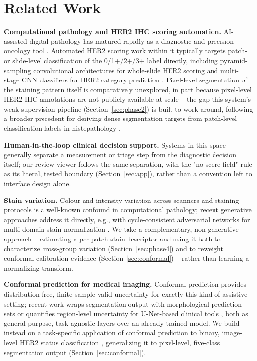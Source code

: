 \documentclass[conference]{IEEEtran}
\begin{document}
\section{Related Work}
\label{sec:related}

\textbf{Computational pathology and HER2 IHC scoring automation.} AI-assisted
digital pathology has matured rapidly as a diagnostic and precision-oncology
tool \cite{bera2019}. Automated HER2 scoring work within it typically
targets patch- or slide-level classification of the 0/1+/2+/3+ label
directly, including pyramid-sampling convolutional architectures for
whole-slide HER2 scoring \cite{selcuk2024} and multi-stage CNN classifiers
for HER2 category prediction \cite{mridha2022}. Pixel-level segmentation of
the staining pattern itself is comparatively unexplored, in part because
pixel-level HER2 IHC annotations are not publicly available at scale --
the gap this system's weak-supervision pipeline (Section~\ref{sec:phase2})
is built to work around, following a broader precedent for deriving dense
segmentation targets from patch-level classification labels in
histopathology \cite{han2021}.

\textbf{Human-in-the-loop clinical decision support.} Systems in this space
generally separate a measurement or triage step from the diagnostic
decision itself; our review-viewer follows the same separation, with the
"no score field" rule as its literal, tested boundary
(Section~\ref{sec:app}), rather than a convention left to interface design
alone.

\textbf{Stain variation.} Colour and intensity variation across scanners
and staining protocols is a well-known confound in computational pathology;
recent generative approaches address it directly, e.g., with
cycle-consistent adversarial networks for multi-domain stain normalization
\cite{hetz2024}. We take a complementary, non-generative approach --
estimating a per-patch stain descriptor \cite{macenko2009} and using it
both to characterize cross-group variation (Section~\ref{sec:phase4}) and
to reweight conformal calibration evidence (Section~\ref{sec:conformal})
-- rather than learning a normalizing transform.

\textbf{Conformal prediction for medical imaging.} Conformal prediction
\cite{vovk2005} provides distribution-free, finite-sample-valid
uncertainty for exactly this kind of assistive setting; recent work wraps
segmentation output with morphological prediction sets
\cite{mossina2025} or quantifies region-level uncertainty for U-Net-based
clinical tools \cite{borden2026}, both as general-purpose, task-agnostic
layers over an already-trained model. We build instead on a
task-specific application of conformal prediction to binary, image-level
HER2 status classification \cite{pintawong2025}, generalizing it to
pixel-level, five-class segmentation output (Section~\ref{sec:conformal}).
\end{document}
